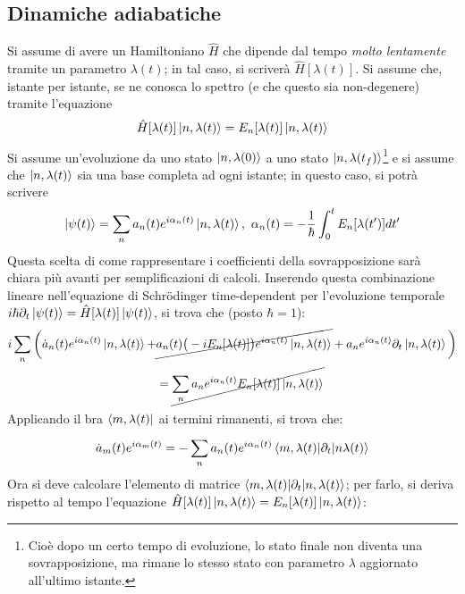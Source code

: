 \documentclass[11pt, a4paper]{scrartcl} %
\numberwithin{equation}{subsection}
\theoremstyle{style2}
\theoremstyle{style1}
\begin{document}
\subsection{Dinamiche adiabatiche}
Si assume di avere un Hamiltoniano $\hat{H}$ che dipende dal tempo \textit{molto lentamente} tramite un parametro $\lambda (t)$; in tal caso, si scriver\`a $\hat{H}[\lambda (t)]$.
Si assume che, istante per istante, se ne conosca lo spettro (e che questo sia non-degenere) tramite l'equazione
\begin{equation}
	\hat{H}[\lambda (t)] \ket{n,\lambda (t)} = E_n[\lambda (t)] \ket{n, \lambda (t)} 
\end{equation}
Si assume un'evoluzione da uno stato $\ket{n,\lambda (0)} $ a uno stato $\ket{n,\lambda (t_f)} $\footnote{Cio\`e dopo un certo tempo di evoluzione, lo stato finale non diventa una sovrapposizione, ma rimane lo stesso stato con parametro $\lambda $ aggiornato all'ultimo istante.} e si assume che $\ket{n, \lambda (t)} $ sia una base completa ad ogni istante; in questo caso, si potr\`a scrivere
\begin{equation}
	\ket{\psi (t)}  = \sum_{n}^{} a_n(t) e^{i \alpha _n(t)} \ket{n, \lambda (t)} , \ \alpha _n (t) = - \frac{1}{\hbar } \int_{0} ^t E_n[\lambda (t')] dt'
\end{equation}
Questa scelta di come rappresentare i coefficienti della sovrapposizione sar\`a chiara pi\`u avanti per semplificazioni di calcoli.
Inserendo questa combinazione lineare nell'equazione di Schr\"odinger time-dependent per l'evoluzione temporale $i\hbar \partial _t \ket{\psi (t)} = \hat{H}[\lambda (t)]\ket{\psi (t)} $, si trova che (posto $\hbar =1$):
\[
\begin{split}
	i \sum_{n}^{} \bigg(\dot{a}_n(t) e^{i\alpha _n(t)} \ket{n,\lambda (t)} + &\cancel{a_n(t) \big(-iE_n [\lambda (t)]\big)e^{i\alpha _n(t)} \ket{n,\lambda (t)}} + a_n e^{i\alpha _n (t)} \partial _t \ket{n,\lambda (t)} \bigg) \\
															     &= \cancel{\sum_{n}^{} a_n e^{i\alpha _n(t)} E_n[\lambda (t)] \ket{n, \lambda (t)} }
\end{split}
\] 
Applicando il bra $\bra{m ,\lambda (t)} $ ai termini rimanenti, si trova che:
\begin{equation}
\dot{a}_m(t) e^{i\alpha _m(t)} = - \sum_{n}^{} a_n(t)e^{i\alpha _n(t)} \braket{m,\lambda (t)|\partial _t|n \lambda (t)} 
\end{equation}
Ora si deve calcolare l'elemento di matrice $\braket{m,\lambda (t)|\partial _t|n,\lambda (t)} $; per farlo, si deriva rispetto al tempo l'equazione $\hat{H}[\lambda (t)] \ket{n,\lambda (t)} = E_n[\lambda (t)] \ket{n,\lambda (t)} $:
\end{document}
